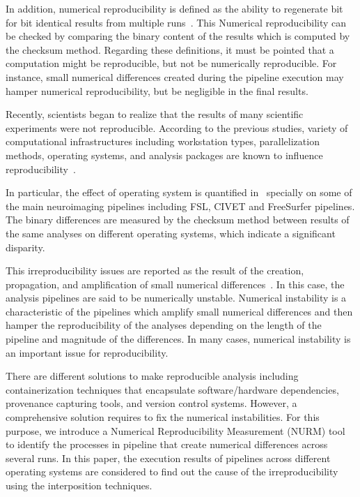 \documentclass[a4paper,num-refs]{oup-contemporary}
\begin{document}
In addition, numerical reproducibility is defined as the ability to 
regenerate bit for bit identical results from multiple 
runs~\cite{hill2017numerical}. This Numerical reproducibility can be 
checked by comparing the binary content of the results which is 
computed by the checksum method.
Regarding these definitions, it must be pointed that a
computation might be reproducible, but not 
be numerically reproducible. For instance, small numerical differences 
created during the pipeline execution may hamper numerical 
reproducibility, but be negligible in the final results.

Recently, scientists began to realize that the results of many 
scientific experiments were not reproducible. According to the previous 
studies, variety of computational infrastructures including workstation 
types, parallelization methods, operating systems, and analysis 
packages are known to influence reproducibility~\cite{Gronenschild2012, 
diethelm2012limits, Glatard2015, bowring2019exploring}.

In particular, the effect of operating system is quantified 
in~\cite{Glatard2015, Gronenschild2012} specially on some of the main 
neuroimaging pipelines including FSL, CIVET and FreeSurfer pipelines. 
The binary differences are measured by the checksum method between 
results of the same analyses on different operating systems, which 
indicate a significant disparity. 

This irreproducibility issues are reported as the result of the 
creation, propagation, and amplification of small numerical 
differences~\cite{Gronenschild2012, diethelm2012limits, Glatard2015, 
bowring2019exploring}. In this case, the analysis pipelines are said to 
be numerically unstable. Numerical instability is a characteristic of 
the pipelines which amplify small numerical differences and then hamper 
the reproducibility of the analyses depending on the length of the 
pipeline and magnitude of the differences. In many cases, numerical 
instability is an important issue for reproducibility.

There are different solutions to make reproducible analysis including 
containerization techniques that encapsulate software/hardware 
dependencies, provenance capturing tools, and version control systems. 
However, a comprehensive solution requires to fix the numerical 
instabilities. For this purpose, we introduce a Numerical 
Reproducibility Measurement (NURM) tool to identify the processes in 
pipeline that create numerical differences across several runs. In this 
paper, the execution results of pipelines across different operating 
systems are considered to find out the cause of the irreproducibility 
using the interposition techniques.
\end{document}

